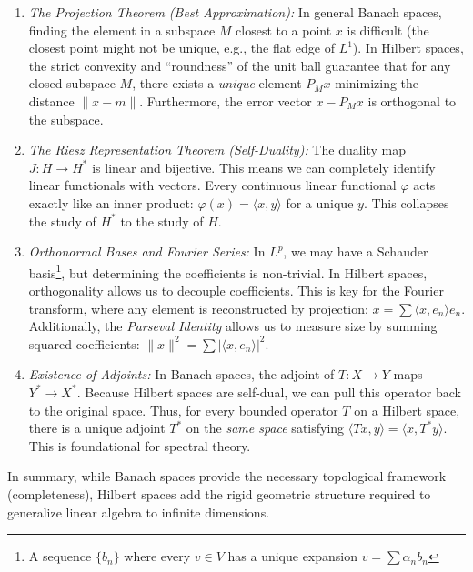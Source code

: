 \documentclass{article}
\let\temp\phi
\let\phi\varphi
\let\varphi\temp
\begin{document}
\begin{enumerate}
    \item \emph{The Projection Theorem (Best Approximation):}
    In general Banach spaces, finding the element in a subspace $M$ closest to a point $x$ is difficult (the
    closest point might not be unique, e.g., the flat edge of $L^1$). In Hilbert spaces, the strict convexity and ``roundness'' of the unit ball guarantee that for any closed subspace $M$, there exists a \emph{unique} element $P_M x$ minimizing the distance $\|x - m\|$. Furthermore, the error vector $x - P_M x$ is orthogonal to the subspace.

    \item \emph{The Riesz Representation Theorem (Self-Duality):}
    The duality map $J: H \to H^*$ is linear and bijective. This means we can completely identify linear functionals with vectors. Every continuous linear functional $\phi$ acts exactly like an inner product: $\phi(x) = \langle x, y \rangle$ for a unique $y$. This collapses the study of $H^*$ to the study of $H$.

	\item \emph{Orthonormal Bases and Fourier Series:} In $L^p$, we may have a Schauder basis\footnote{A sequence $\{b_n\}$ where every $v \in V$ has a unique expansion $v = \sum \alpha_nb_n$}, but determining the coefficients is non-trivial. In Hilbert spaces, orthogonality allows us to decouple coefficients. This is key for the Fourier transform, where any element is reconstructed by projection: $x = \sum \langle x, e_n \rangle e_n$. Additionally, the \emph{Parseval Identity} allows us to measure size by summing squared coefficients: $\|x\|^2 = \sum |\langle x, e_n \rangle|^2$.

    \item \emph{Existence of Adjoints:}
    In Banach spaces, the adjoint of $T: X \to Y$ maps $Y^* \to X^*$. Because Hilbert spaces are self-dual, we can pull this operator back to the original space. Thus, for every bounded operator $T$ on a Hilbert space, there is a unique adjoint $T^*$ on the \emph{same space} satisfying $\langle Tx, y \rangle = \langle x, T^* y \rangle$. This is foundational for spectral theory.
\end{enumerate}

In summary, while Banach spaces provide the necessary topological framework (completeness), Hilbert spaces add the rigid geometric structure required to generalize linear algebra to infinite dimensions.



\end{document}
